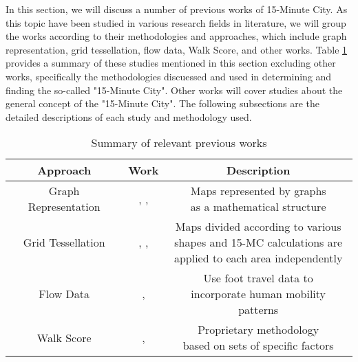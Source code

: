 In this section, we will discuss a number of previous works of 15-Minute City. As this topic have been studied in various research fields in literature, we will group the works according to their methodologies and approaches, which include graph representation, grid tessellation, flow data, Walk Score, and other works. Table \ref{previous_works} provides a summary of these studies mentioned in this section excluding other works, specifically the methodologies discuessed and used in determining and finding the so-called "15-Minute City". Other works will cover studies about the general concept of the "15-Minute City". The following subsections are the detailed descriptions of each study and methodology used.

\begin{table}
    \begin{center}
        \caption{Summary of relevant previous works}
        \label{previous_works}
        \begin{tabular}{ |c|c|c| }
            \hline
            \textbf{Approach} & \textbf{Work} & \textbf{Description} \\
            \hline
            \hline
            Graph Representation & \makecell{\cite{barbieri_graph_2023}, \cite{caselli_exploring_2022},\\\cite{rhoads_inclusive_2023}} & \makecell{Maps represented by graphs\\as a mathematical structure}\\
            \hline
            Grid Tessellation & \makecell{\cite{gaglione_urban_2022}, \cite{olivari_are_2023},\\\cite{Pezzica_Altafini_Mara_Chioni_2024}} & \makecell{Maps divided according to various\\shapes and 15-MC calculations are\\applied to each area independently} \\
            \hline
            Flow Data & \cite{zhang_towards_2023}, \cite{sarkar_measuring_2020} & \makecell{Use foot travel data to\\incorporate human mobility patterns} \\
            \hline
            Walk Score & \cite{walkscore}, \cite{weng_15-minute_2019} & \makecell{Proprietary methodology\\based on sets of specific factors} \\
            \hline
        \end{tabular}
    \end{center}
\end{table}

